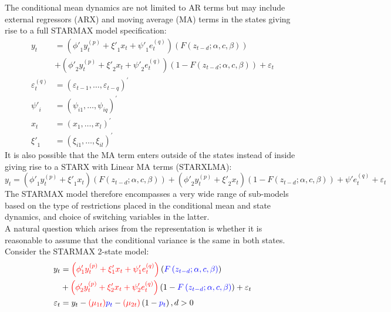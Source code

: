 The conditional mean dynamics are not limited to AR terms but may include
external regressors (ARX) and moving average (MA) terms in the states giving
rise to a full STARMAX model specification:
\begin{equation}\label{eq:starmax}
\begin{split}
{y_t} &= \left( {{{\phi '}_1}y_t^{\left( p \right)} + {{\xi '}_1}{x_t} + {{\psi
'}_1}e_t^{\left( q \right)}} \right)\left( {F\left( {{z_{t-d}}; \alpha , c,\beta }
\right)} \right) \\
& + \left( {{{\phi '}_2}y_t^{\left( p \right)} + {{\xi
'}_2}{x_t} + {{\psi '}_2}e_t^{\left( q \right)}} \right)\left( {1 - F\left( {{z_{t-d}}; \alpha , c,\beta } \right)} \right) + {\varepsilon _t} \\
\varepsilon _t^{\left( q \right)} &= {\left( {{\varepsilon _{t -1}},\dots,{\varepsilon _{t - q}}} \right)^\prime }\\
{{\psi '}_i} &= {\left( {{\psi_{i1}},\dots,{\psi _{iq}}} \right)^\prime }\\
{x_t} &= {\left({{x_1},\dots,{x_l}} \right)^\prime }\\
{{\xi '}_1} &= {\left( {{\xi_{i1}},\dots,{\xi _{il}}} \right)^\prime }
\end{split}
\end{equation}
It is also possible that the MA term enters outside of the states instead of
inside giving rise to a STARX with Linear MA terms (STARXLMA):
\begin{equation}
{y_t} = \left( {{{\phi '}_1}y_t^{\left( p \right)} + {{\xi '}_1}{x_t}}
\right)\left( {F\left( {{z_{t-d}};\alpha ,c,\beta } \right)} \right) + \left(
{{{\phi '}_2}y_t^{\left( p \right)} + {{\xi '}_2}{x_t}} \right)\left( {1 -
F\left( {{z_{t-d}};\alpha ,c,\beta } \right)} \right) + \psi 'e_t^{\left( q
\right)} +{\varepsilon _t}
\end{equation}
The STARMAX model therefore encompasses a very wide range of sub-models based on
the type of restrictions placed in the conditional mean and state dynamics, and
choice of switching variables in the latter.\\
A natural question which arises from the representation is whether it is
reasonable to assume that the conditional variance is the same in both states.
Consider the STARMAX 2-state model:
\begin{equation}
\begin{split}
{y_t} &= {\color{red} \left(\phi'_1 y_t^{\left( p \right)} + \xi'_1 x_t + \psi'_1 e_t^{\left( q \right)} \right)} \left( {\color{blue} F\left( z_{t-d}; \alpha , c,\beta \right)}\right) \\
&+ {\color{red} \left( \phi'_2 y_t^{\left( p \right)} + \xi'_2 x_t + \psi'_2 e_t^{\left( q \right)} \right)}\left(1 - {\color{blue} F\left(z_{t-d}; \alpha , c,\beta\right)} \right) + {\varepsilon_t} \\
{\varepsilon_t} &= {y_t} - {\color{red} \left( \mu _{1t} \right)}{\color{blue} p_t} - {\color{red} \left( \mu _{2t} \right)}\left( 1 -{\color{blue} {p_t}} \right), d>0
\end{split}
\end{equation}
